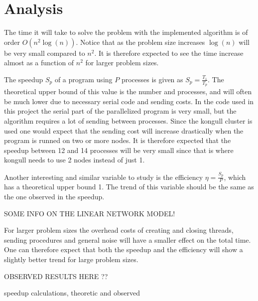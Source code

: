 \section{Analysis}

The time it will take to solve the problem with the implemented algorithm is of order $O(n^2\log(n))$.
Notice that as the problem size increases $\log(n)$ will be very small compared to $n^2$. It is therefore expected to see
the time increase almost as a function of $n^2$ for larger problem sizes.

The speedup $S_p$ of a program using $P$ processes is given as $S_p=\frac{T_1}{T_p}$. 
The theoretical upper bound of this value is the number and processes, and will often be much lower 
due to necessary serial code and sending costs. In the code used in this project the serial part of the parallelized program is 
very small, but the algorithm requires a lot of sending between processes. Since the kongull cluster is used one would expect 
that the sending cost will increase drastically when the program is runned on two or more nodes. It is therefore expected that 
the speedup between 12 and 14 processes will be very small since that is where kongull needs to use 2 nodes instead of just 1.

Another interesting and similar variable to study is the efficiency $\eta = \frac{S_p}{P}$, which has a theoretical upper bound 1.
The trend of this variable should be the same as the one observed in the speedup. 

SOME INFO ON THE LINEAR NETWORK MODEL! 

For larger problem sizes the overhead costs of creating and closing threads, sending procedures and general noise will have
a smaller effect on the total time. One can therefore expect that both the speedup and the efficiency will show a slightly better
trend for large problem sizes. 

OBSERVED RESULTS HERE ??

speedup calculations, theoretic and observed


